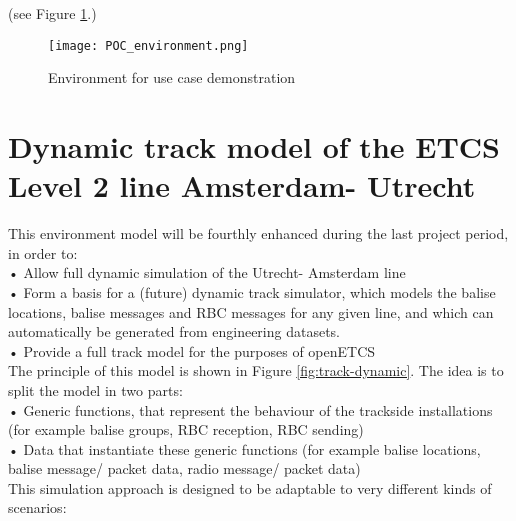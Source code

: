 (see Figure \ref{fig:WP3-demo}.)
	
\begin{figure}
  \centering
  \texttt{[image: POC\_environment.png]}
  \caption{Environment for use case demonstration}
  \label{fig:WP3-demo}
\end{figure}




\section{Dynamic track model of the ETCS Level 2 line Amsterdam- Utrecht}

This environment model will be fourthly enhanced during the last project period, in order to:\\

•   Allow full dynamic simulation of the Utrecht- Amsterdam line\\
•   Form a basis for a (future) dynamic track simulator, which models the balise locations, balise messages and RBC messages for any given line, and which can automatically be generated from engineering datasets.\\
•   Provide a full track model for the purposes of openETCS\\

The principle of this model is shown in Figure \ref{fig:track-dynamic}. 
The idea is to split the model in two parts:\\
•  	Generic functions, that represent the behaviour of the trackside installations (for example balise groups, RBC reception, RBC sending)\\
•  	Data that instantiate these generic functions (for example balise locations, balise message/ packet data, radio message/ packet data)\\

This simulation approach is designed to be adaptable to very different kinds of scenarios:\\

